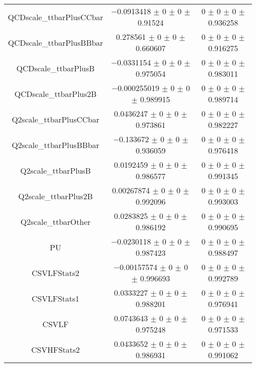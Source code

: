 \begin{table}
\begin{tabular}{ccc}
QCDscale\_ttbarPlusCCbar & \num{-0.0913418} $\pm$ \num{0} $\pm$ \num{0} $\pm$ \num{0.91524} & \num{0} $\pm$ \num{0} $\pm$ \num{0} $\pm$ \num{0.936258}\\
QCDscale\_ttbarPlusBBbar & \num{0.278561} $\pm$ \num{0} $\pm$ \num{0} $\pm$ \num{0.660607} & \num{0} $\pm$ \num{0} $\pm$ \num{0} $\pm$ \num{0.916275}\\
QCDscale\_ttbarPlusB & \num{-0.0331154} $\pm$ \num{0} $\pm$ \num{0} $\pm$ \num{0.975054} & \num{0} $\pm$ \num{0} $\pm$ \num{0} $\pm$ \num{0.983011}\\
QCDscale\_ttbarPlus2B & \num{-0.000255019} $\pm$ \num{0} $\pm$ \num{0} $\pm$ \num{0.989915} & \num{0} $\pm$ \num{0} $\pm$ \num{0} $\pm$ \num{0.989714}\\
Q2scale\_ttbarPlusCCbar & \num{0.0436247} $\pm$ \num{0} $\pm$ \num{0} $\pm$ \num{0.973861} & \num{0} $\pm$ \num{0} $\pm$ \num{0} $\pm$ \num{0.982227}\\
Q2scale\_ttbarPlusBBbar & \num{-0.133672} $\pm$ \num{0} $\pm$ \num{0} $\pm$ \num{0.936059} & \num{0} $\pm$ \num{0} $\pm$ \num{0} $\pm$ \num{0.976418}\\
Q2scale\_ttbarPlusB & \num{0.0192459} $\pm$ \num{0} $\pm$ \num{0} $\pm$ \num{0.986577} & \num{0} $\pm$ \num{0} $\pm$ \num{0} $\pm$ \num{0.991345}\\
Q2scale\_ttbarPlus2B & \num{0.00267874} $\pm$ \num{0} $\pm$ \num{0} $\pm$ \num{0.992096} & \num{0} $\pm$ \num{0} $\pm$ \num{0} $\pm$ \num{0.993003}\\
Q2scale\_ttbarOther & \num{0.0283825} $\pm$ \num{0} $\pm$ \num{0} $\pm$ \num{0.986192} & \num{0} $\pm$ \num{0} $\pm$ \num{0} $\pm$ \num{0.990695}\\
PU & \num{-0.0230118} $\pm$ \num{0} $\pm$ \num{0} $\pm$ \num{0.987423} & \num{0} $\pm$ \num{0} $\pm$ \num{0} $\pm$ \num{0.988497}\\
CSVLFStats2 & \num{-0.00157574} $\pm$ \num{0} $\pm$ \num{0} $\pm$ \num{0.996693} & \num{0} $\pm$ \num{0} $\pm$ \num{0} $\pm$ \num{0.992789}\\
CSVLFStats1 & \num{0.0333227} $\pm$ \num{0} $\pm$ \num{0} $\pm$ \num{0.988201} & \num{0} $\pm$ \num{0} $\pm$ \num{0} $\pm$ \num{0.976941}\\
CSVLF & \num{0.0743643} $\pm$ \num{0} $\pm$ \num{0} $\pm$ \num{0.975248} & \num{0} $\pm$ \num{0} $\pm$ \num{0} $\pm$ \num{0.971533}\\
CSVHFStats2 & \num{0.0433652} $\pm$ \num{0} $\pm$ \num{0} $\pm$ \num{0.986931} & \num{0} $\pm$ \num{0} $\pm$ \num{0} $\pm$ \num{0.991062}\\

\end{tabular}
\end{table}
